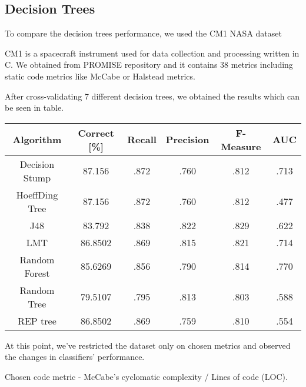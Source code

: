 \subsection{Decision Trees}
To compare the decision trees performance, we used the CM1 NASA dataset

CM1 is a spacecraft instrument used for data collection and processing written in C. We obtained from PROMISE repository and it contains 38 metrics including static code metrics like McCabe or Halstead metrics.

After cross-validating 7 different decision trees, we obtained the results which can be seen in table.

\begin{center}
\begin{tabular}{ |c|c|c|c|c|c| } 
 \hline
 \textbf{Algorithm} & \textbf{Correct [\%]} & \textbf{Recall} & \textbf{Precision} & \textbf{F-Measure} & \textbf{AUC}  \\ 
 \hline
 Decision Stump & \textcolor{myRed}{87.156} & \textcolor{myRed}{.872} & .760 & .812 & .713   \\ 
 \hline
 HoeffDing Tree & \textcolor{myRed}{87.156} & \textcolor{myRed}{.872} & .760 & .812 & .477   \\ 
 \hline
  J48 & 83.792 & .838 & \textcolor{myRed}{.822} & \textcolor{myRed}{.829} & .622   \\ 
 \hline
  LMT & 86.8502 & .869 & .815 & .821 & .714    \\ 
 \hline
  Random Forest & 85.6269 & .856 & .790 & .814 & \textcolor{myRed}{.770}   \\ 
 \hline
  Random Tree & 79.5107 & .795 & .813 & .803 & .588   \\ 
 \hline
 REP tree  & 86.8502 & .869 & .759 & .810 & .554   \\ 
 \hline
\end{tabular}
\end{center}


At this point, we've restricted the dataset only on chosen metrics and observed the changes  in classifiers' performance.

Chosen code metric - McCabe's cyclomatic complexity / Lines of code (LOC).

